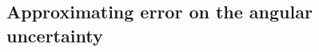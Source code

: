 \documentclass[tightenlines,
twocolumn,prl,notitlepage,nofootinbib,preprintnumbers,longbibliography]{revtex4-1}
\begin{document}












\subsection{Approximating error on the angular uncertainty}
\end{document}
